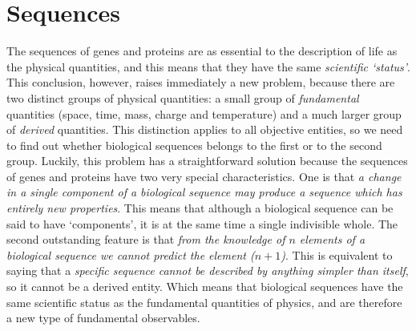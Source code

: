 \documentclass[12pt]{article}
\begin{document}
\section{Sequences}
The sequences of genes and proteins are as essential to the description of life as the physical quantities, and this means that they have the same \textit{scientific `status'}. This conclusion, however, raises immediately a new problem, because there are two distinct groups of physical quantities: a small group of \textit{fundamental} quantities (space, time, mass, charge and temperature) and a much larger group of \textit{derived} quantities. This distinction applies to all objective entities, so we need to find out whether biological sequences belongs to the first or to the second group. Luckily, this problem has a straightforward solution because the sequences of genes and proteins have two very special characteristics. One is that \textit{a change in a single component of a biological sequence may produce a sequence which has entirely new properties}. This means that although a biological sequence can be said to have `components', it is at the same time a single indivisible whole. The second outstanding feature is that \textit{from the knowledge of $n$ elements of a biological sequence we cannot predict the element ($n+1$)}. This is equivalent to saying that a \textit{specific sequence cannot be described by anything simpler than itself}, so it cannot be a derived entity. Which means that biological sequences have the same scientific status as the fundamental quantities of physics, and are therefore a new type of fundamental observables. 
\end{document}
